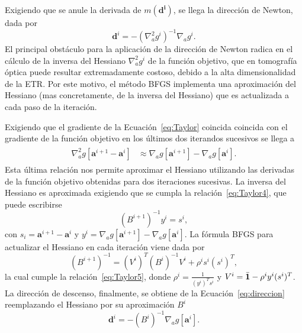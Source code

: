 Exigiendo que se anule la derivada de $m(\mathbf{d^i})$, se llega la dirección de Newton, dada por
\begin{equation}
\mathbf{d}^i=-(\nabla_a^2 g^i )^{-1} \nabla_a g^i.
\label{eq:direccion}
\end{equation}
El principal obstáculo para la aplicación de la dirección de Newton radica en el cálculo de la inversa del Hessiano $\nabla_a^2 g^i$ de la función objetivo,  
que en tomografía óptica puede 
resultar extremadamente costoso, debido a la alta dimensionalidad de la ETR. 
Por este motivo, el método BFGS implementa una aproximación del Hessiano (mas concretamente, 
de la inversa del Hessiano) que 
es actualizada a cada paso de la iteración. 

Exigiendo que el gradiente de la Ecuación~\eqref{eq:Taylor} coincida coincida con el gradiente de la función objetivo 
en los últimos dos iterandos sucesivos se llega a
\begin{equation}
\begin{split}
\begin{aligned}
\nabla_a^2 g[\mathbf{a}^{i+1}-\mathbf{a}^i]& \approx \nabla_a g[\mathbf{a}^{i+1}]  - \nabla_a g[\mathbf{a}^{i}].
\end{aligned}
\end{split}
\label{eq:Taylor4}
\end{equation}
Esta última relación nos permite aproximar el Hessiano utilizando las derivadas de 
la función objetivo obtenidas para dos iteraciones sucesivas. 
La inversa del Hessiano es aproximada exigiendo que se cumpla la relación~\eqref{eq:Taylor4}, que puede escribirse 
\begin{equation}
(B^{i+1})^{-1}y^i=s^i,
\label{eq:Taylor5}
\end{equation}
con $s_i=  \mathbf{a}^{i+1}-\mathbf{a}^{i}$ y $y^i=\nabla_a g[\mathbf{a}^{i+1}]  - \nabla_a g[\mathbf{a}^{i}]$. 
La fórmula BFGS para actualizar el Hessiano en cada iteración viene dada por~\cite{Nocedal2006}
\begin{equation}
(B^{i+1})^{-1}=(V^i)^T (B^{i})^{-1}V^i + \rho^i s^i (s^i)^T  ,
\label{eq:HBFGS}
\end{equation}
la cual cumple la relación~\eqref{eq:Taylor5}, donde $\rho^i=\frac{1}{(y^i)^T s^i}$ 
y $V^i=\bar{\mathbf{1}} - \rho^i y^i (s^i)^T$. 
La dirección de descenso, finalmente, se obtiene de la Ecuación~\eqref{eq:direccion} reemplazando 
el Hessiano por su aproximación $B^i$
\begin{equation}
\mathbf{d}^{i}=-(B^{i})^{-1} \nabla_a g[\mathbf{a}^i]. 
\label{eq:HBFGS2}
\end{equation}

